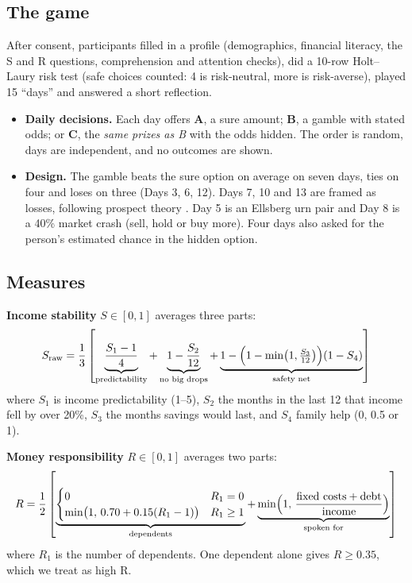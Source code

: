 \documentclass[10pt,a4paper]{article}
\begin{document}
\subsection{The game}

After consent, participants filled in a profile (demographics, financial literacy, the S and R questions, comprehension and attention checks), did a 10-row Holt--Laury risk test \cite{holtlaury} (safe choices counted: 4 is risk-neutral, more is risk-averse), played 15 ``days'' and answered a short reflection.

\begin{itemize}
\item \textbf{Daily decisions.} Each day offers \textbf{A}, a sure amount; \textbf{B}, a gamble with stated odds; or \textbf{C}, the \emph{same prizes as B} with the odds hidden. The order is random, days are independent, and no outcomes are shown.
\item \textbf{Design.} The gamble beats the sure option on average on seven days, ties on four and loses on three (Days 3, 6, 12). Days 7, 10 and 13 are framed as losses, following prospect theory \cite{kt}. Day 5 is an Ellsberg urn pair and Day 8 is a 40\% market crash (sell, hold or buy more). Four days also asked for the person's estimated chance in the hidden option.
\end{itemize}

\subsection{Measures}

\textbf{Income stability} $S \in [0,1]$ averages three parts:
\[
S_{\text{raw}} = \frac{1}{3}\left[\underbrace{\frac{S_1-1}{4}}_{\text{predictability}}
+ \underbrace{1-\frac{S_2}{12}}_{\text{no big drops}}
+ \underbrace{1-\Bigl(1-\min\bigl(1,\tfrac{S_3}{12}\bigr)\Bigr)(1-S_4)}_{\text{safety net}}\right]
\]
where $S_1$ is income predictability (1--5), $S_2$ the months in the last 12 that income fell by over 20\%, $S_3$ the months savings would last, and $S_4$ family help (0, 0.5 or 1).

\textbf{Money responsibility} $R \in [0,1]$ averages two parts:
\[
R = \frac{1}{2}\left[\underbrace{\begin{cases}0 & R_1 = 0\\ \min\bigl(1,\,0.70+0.15(R_1-1)\bigr) & R_1 \ge 1\end{cases}}_{\text{dependents}}
+ \underbrace{\min\Bigl(1,\,\frac{\text{fixed costs}+\text{debt}}{\text{income}}\Bigr)}_{\text{spoken for}}\right]
\]
where $R_1$ is the number of dependents. One dependent alone gives $R \ge 0.35$, which we treat as high R.
\end{document}
